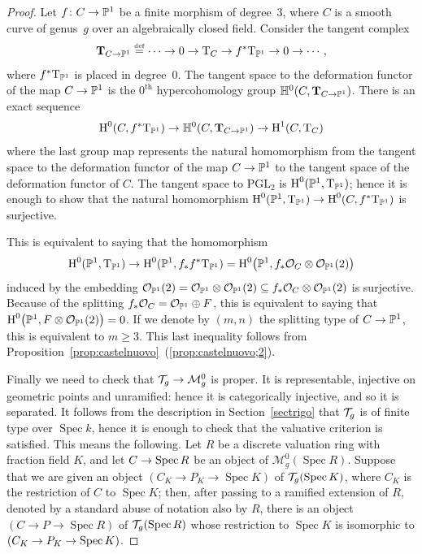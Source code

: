 \documentclass{amsart}
\numberwithin{equation}{section}
\numberwithin{subsection}{section}
\theoremstyle{definition}
\theoremstyle{remark}
\newcommand\refall[2]{\ref{#1}~(\ref{#1;#2})}
\newcommand\cM{\mathcal{M}} \newcommand\cN{\mathcal{N}}
\newcommand\cO{\mathcal{O}} \newcommand\cP{\mathcal{P}}
\newcommand\arr{\ifinner\to\else\longrightarrow\fi}
\renewcommand\H{\operatorname{H}}
\newcommand\eqdef{\overset{\mathrm{\scriptscriptstyle def}} =}
\renewcommand\th{^\text{th}}
\newcommand\spec{\operatorname{Spec}}
\newcommand{\T}[1][g]{\cT_{#1}}
\newcommand{\PGL}{\mathrm{PGL}}
\begin{document}
\begin{proof}
Let $f\colon C \arr \PP^{1}$ be a finite morphism of degree~$3$, where $C$ is a smooth curve of genus~$g$ over an algebraically closed field. Consider the tangent complex
   \[
   \bT_{C \to \PP^{1}} \eqdef
   \cdots \arr 0 \arr \rT_{C} \arr f^{*}\rT_{\PP^{1}} \arr 0 \arr \cdots,
   \]
where $f^{*}\mathrm{T}_{\mathbb{P}^{1}}$ is placed in degree~$0$. The tangent space to the deformation functor of the map $C \arr \PP^{1}$ is the $0\th$ hypercohomology group $\mathbb{H}^{0}(C, \mathbf{T}_{C \to \mathbb{P}^{1}})$. There is an exact sequence
   \[
   \H^{0}(C, f^{*}\rT_{\PP^{1}})
   \arr \HH^{0}(C, \bT_{C \to \PP^{1}})
   \arr \H^{1}(C, \rT_{C})
   \]
where the last group map represents the natural homomorphism from the tangent space to the deformation functor of the map $C \arr \PP^{1}$ to the tangent space of the deformation functor of $C$. The tangent space to $\PGL_{2}$ is $\H^{0}(\PP^{1}, \rT_{\PP^{1}})$; hence it is enough to show that the natural homomorphism $\H^{0}(\PP^{1}, \rT_{\PP^{1}}) \arr \H^{0}(C, f^{*}\rT_{\PP^{1}})$ is surjective.

This is equivalent to saying that the homomorphism
   \[
   \H^{0}(\PP^{1}, \rT_{\PP^{1}})
   \arr \H^{0}(\PP^{1}, f_{*}f^{*}\rT_{\PP^{1}})
   = \H^{0}\bigl(\PP^{1}, f_{*}\cO_{C}\otimes\cO_{\PP^{1}}(2)\bigr)
   \]
induced by the embedding $\cO_{\PP^{1}}(2) = \cO_{\PP^{1}}\otimes\cO_{\PP^{1}}(2) \subseteq f_{*}\cO_{C}\otimes\cO_{\PP^{1}}(2)$ is surjective. Because of the splitting $f_{*}\cO_{C} = \cO_{\PP^{1}} \oplus F$, this is equivalent to saying that $\H^{0}\bigl(\PP^{1}, F \otimes \cO_{\PP^{1}}(2)\bigr) = 0$. If we denote by $(m,n)$ the splitting type of $C \arr \PP^{1}$, this is equivalent to $m \geq3$. This last inequality follows from Proposition~\refall{prop:castelnuovo}{2}.

Finally we need to check that $\T \arr \cM^{0}_{g}$ is proper. It is representable, injective on geometric points and unramified: hence it is categorically injective, and so it is separated. It follows from the description in Section~\ref{sectrigo} that $\T$ is of finite type over $\spec k$, hence it is enough to check that the valuative criterion is satisfied. This means the following. Let $R$ be a discrete valuation ring with fraction field $K$, and let $C \arr \spec R$ be an object of $\cM^{0}_{g}(\spec R)$. Suppose that we are given an object $(C_{K} \to P_{K} \to \spec K)$ of $\T(\spec K)$, where $C_{K}$ is the restriction of $C$ to $\spec K$; then, after passing to a ramified extension of $R$, denoted by a standard abuse of notation also by $R$, there is an object $(C \to P \to \spec R)$ of $\T(\spec R)$ whose restriction to $\spec K$ is isomorphic to $(C_{K} \arr P_{K} \arr \spec K)$.


\end{proof}
\end{document}
